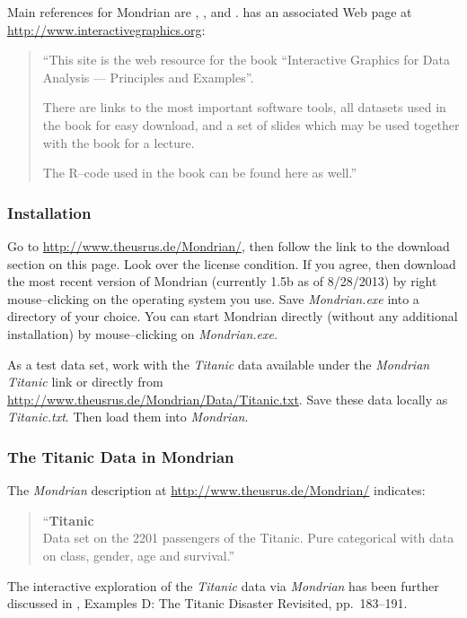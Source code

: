 \documentclass[12pt,letterpaper,final]{article}
\begin{document}
Main references for Mondrian are
\cite{Theu2002}, \cite{Theu2003}, and \cite{TU2009}.
\cite{TU2009} has an associated Web page at \\
\url{http://www.interactivegraphics.org}:
\begin{quotation}
``This site is the web resource for the book ``Interactive Graphics for Data Analysis --- 
Principles and Examples''.

There are links to the most important software tools, all datasets used in the book for 
easy download, and a set of slides which may be used together with the book for a lecture.

The R--code used in the book can be found here as well.''
\end{quotation}


\subsubsection{Installation}


Go to \url{http://www.theusrus.de/Mondrian/}, then follow the link to
the download section on this page. Look over the license condition.
If you agree, then download the most recent version of Mondrian
(currently 1.5b as of 8/28/2013) by right mouse--clicking on the operating system
you use. Save {\it Mondrian.exe} into a directory of your choice. You can start Mondrian
directly (without any additional installation) by mouse--clicking on {\it Mondrian.exe}.

As a test data set, work with the {\it Titanic} data available 
under the {\it Mondrian} {\it Titanic} link or directly
from \url{http://www.theusrus.de/Mondrian/Data/Titanic.txt}.
Save these data locally as {\it Titanic.txt}. Then load them into {\it Mondrian}.


\subsubsection{The Titanic Data in Mondrian}


The {\it Mondrian} description at \url{http://www.theusrus.de/Mondrian/} indicates:
\begin{quotation}
\noindent
``{\bf Titanic} \\[0.2cm]
Data set on the 2201 passengers of the Titanic. Pure categorical with data on 
class, gender, age and survival.''
\end{quotation}


The interactive exploration of the {\it Titanic} data via 
{\it Mondrian} has been further discussed in
\cite{TU2009}, Examples D: The Titanic Disaster Revisited, pp.~183--191.
\end{document}

